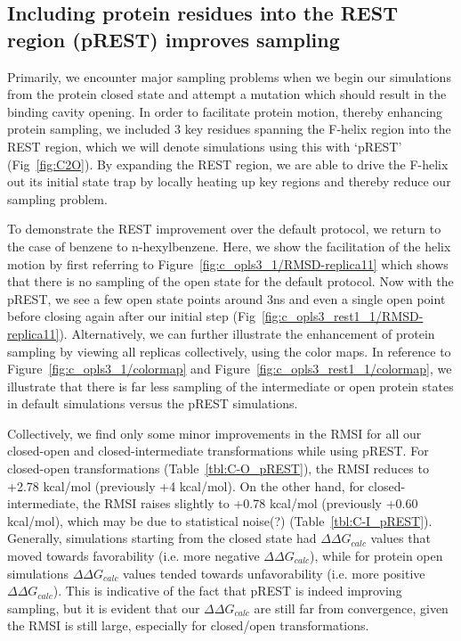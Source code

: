 \documentclass[journal=jctcce,manuscript=article]{achemso}
\begin{document}
\subsection*{Including protein residues into the REST region (pREST) improves sampling}
Primarily, we encounter major sampling problems when we begin our simulations from the protein closed state and attempt a mutation which should result in the binding cavity opening.
In order to facilitate protein motion, thereby enhancing protein sampling, we included 3 key residues spanning the F-helix region into the REST region, which we will denote simulations using this with `pREST' (Fig~\ref{fig:C2O}).
By expanding the REST region, we are able to drive the F-helix out its initial state trap by locally heating up key regions and thereby reduce our sampling problem.

To demonstrate the REST improvement over the default protocol, we return to the case of benzene to n-hexylbenzene.
Here, we show the facilitation of the helix motion by first referring to Figure~\ref{fig:c_opls3_1/RMSD-replica11} which shows that there is no sampling of the open state for the default protocol.
Now with the pREST, we see a few open state points around 3ns and even a single open point before closing again after our initial step (Fig~\ref{fig:c_opls3_rest1_1/RMSD-replica11}).
Alternatively, we can further illustrate the enhancement of protein sampling by viewing all replicas collectively, using the color maps.
In reference to Figure~\ref{fig:c_opls3_1/colormap} and Figure~\ref{fig:c_opls3_rest1_1/colormap}, we illustrate that there is far less sampling of the intermediate or open protein states in default simulations versus the pREST simulations.
 
Collectively, we find only some minor improvements in the RMSI for all our closed-open and closed-intermediate transformations while using pREST. 
For closed-open transformations (Table~\ref{tbl:C-O_pREST}), the RMSI reduces to +2.78 kcal/mol (previously +4 kcal/mol). 
On the other hand, for closed-intermediate, the RMSI raises slightly to +0.78 kcal/mol (previously +0.60 kcal/mol), which may be due to statistical noise(?) (Table~\ref{tbl:C-I_pREST}).
Generally, simulations starting from the closed state had $\Delta\Delta G_{calc}$ values that moved towards favorability (i.e. more negative $\Delta\Delta G_{calc}$), while for protein open simulations $\Delta\Delta G_{calc}$ values tended towards unfavorability (i.e. more positive $\Delta\Delta G_{calc}$).
This is indicative of the fact that pREST is indeed improving sampling, but it is evident that our $\Delta\Delta G_{calc}$ are still far from convergence, given the RMSI is still large, especially for closed/open transformations.
\end{document}
